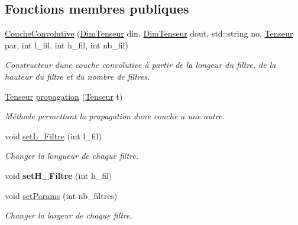 \subsection*{Fonctions membres publiques}
\begin{DoxyCompactItemize}
\item 
\hyperlink{class_couche_convolutive_ac0e9fc1269646ff46ab9ea2a26489123}{Couche\+Convolutive} (\hyperlink{class_dim_tenseur}{Dim\+Tenseur} din, \hyperlink{class_dim_tenseur}{Dim\+Tenseur} dout, std\+::string no, \hyperlink{class_tenseur}{Tenseur} par, int l\+\_\+fil, int h\+\_\+fil, int nb\+\_\+fil)
\begin{DoxyCompactList}\small\item\em Constructeur d\textquotesingle{}une couche convolutive à partir de la longeur du filtre, de la hauteur du filtre et du nombre de filtres. \end{DoxyCompactList}\item 
\hyperlink{class_tenseur}{Tenseur} \hyperlink{class_couche_convolutive_ad1a55b3dc9bf52e0725ae2a7b2e92aa1}{propagation} (\hyperlink{class_tenseur}{Tenseur} t)
\begin{DoxyCompactList}\small\item\em Méthode permettant la propagation d\textquotesingle{}une couche a une autre. \end{DoxyCompactList}\item 
\mbox{\label{class_couche_convolutive_a1923173423085bc194b2484ff7b6d922}} 
void \hyperlink{class_couche_convolutive_a1923173423085bc194b2484ff7b6d922}{set\+L\+\_\+\+Filtre} (int l\+\_\+fil)
\begin{DoxyCompactList}\small\item\em Changer la longueur de chaque filtre. \end{DoxyCompactList}\item 
\mbox{\label{class_couche_convolutive_a352b530060db1a2b20a8df3f9daaf026}} 
void {\bfseries set\+H\+\_\+\+Filtre} (int h\+\_\+fil)
\item 
void \hyperlink{class_couche_convolutive_a30fd844fc3a96f2e90d1a20251b1bfe3}{set\+Params} (int nb\+\_\+filtres)
\begin{DoxyCompactList}\small\item\em Changer la largeur de chaque filtre. \end{DoxyCompactList}\end{DoxyCompactItemize}


